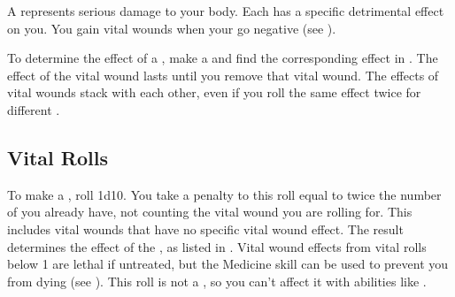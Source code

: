 
  A  represents serious damage to your body.
  Each  has a specific detrimental effect on you.
  You gain vital wounds when your  go negative (see ).

  To determine the effect of a , make a  and find the corresponding effect in .
  The effect of the vital wound lasts until you remove that vital wound.
  The effects of vital wounds stack with each other, even if you roll the same effect twice for different .

  \subsection{Vital Rolls}\label{Vital Rolls}
    To make a , roll 1d10.
    You take a penalty to this roll equal to twice the number of  you already have, not counting the vital wound you are rolling for.
    This includes vital wounds that have no specific vital wound effect.
    The result determines the effect of the , as listed in .
    Vital wound effects from vital rolls below 1 are lethal if untreated, but the Medicine skill can be used to prevent you from dying (see ).
    This roll is not a , so you can't affect it with abilities like .

